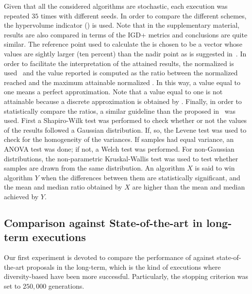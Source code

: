 Given that all the considered algorithms are stochastic, each execution was repeated $35$ times with different seeds.
%
In order to compare the different schemes, the hypervolume indicator (\HV{}) is used.
%
Note that in the supplementary material, results are also compared in terms of the IGD+ metrics and conclusions are quite similar.
%
The reference point used to calculate the \HV{} is chosen to be a vector whose values are sightly larger (ten percent) than the nadir point 
as is suggested in~\cite{ishibuchi2017reference}.
%
In order to facilitate the interpretation of the attained results, the normalized \HV{} is used~\cite{li2015evolutionary}
and the value reported is computed as the ratio between the normalized \HV{} reached and the maximum attainable 
normalized \HV{}.
%
In this way, a value equal to one means a perfect approximation.
%
Note that a value equal to one is not attainable because a discrete approximation is obtained by \MOEAS{}.
%
Finally, in order to statistically compare the \HV{} ratios, a similar guideline than the proposed in~\cite{Joel:StatisticalTest} was used. 
%
First a Shapiro-Wilk test was performed to check whether or not the values of the results followed a Gaussian distribution. 
%
If, so, the Levene test was used to check for the homogeneity of the variances. 
%
If samples had equal variance, an ANOVA test was done; if not, a Welch test was performed. 
%
For non-Gaussian distributions, the non-parametric Kruskal-Wallis test was used to test whether samples are drawn from the same distribution. 
%
An algorithm $X$ is said to win algorithm $Y$ when the differences between them are statistically significant, and the mean and median \HV{} ratio 
obtained by $X$ are higher than the mean and median achieved by $Y$.

%

\subsection{Comparison against State-of-the-art \MOEAS{} in long-term executions}

Our first experiment is devoted to compare the performance of \VSDMOEA{} against state-of-the-art proposals in the long-term, which
is the kind of executions where diversity-based \EAS{} have been more successful.
%
Particularly, the stopping criterion was set to $250,000$ generations.
%

